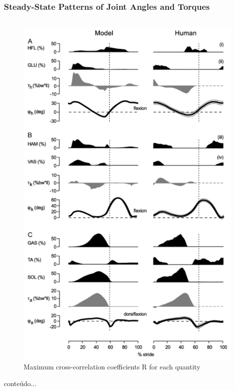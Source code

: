 \documentclass[10pt]{beamer}
\begin{document}
\begin{frame}
	\frametitle{Steady-State Patterns of Joint Angles and Torques}
	
	\begin{columns}
		\begin{column}{.5\textwidth}
			\begin{figure}
				\centering
				\includegraphics[height=.75\textheight]{images/graphic_4.pdf}
				\caption{Maximum cross-correlation coefficients R for each quantity}	
			\end{figure}
			conteúdo...
		\end{column}
	\end{columns}
\end{frame}
\end{document}
